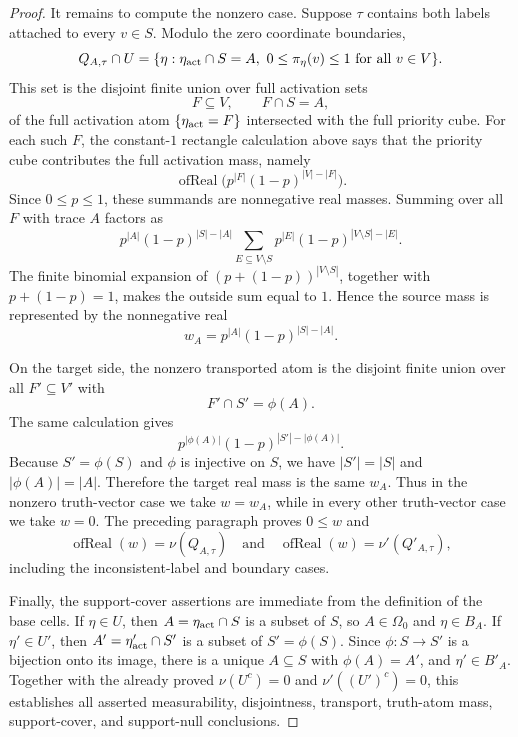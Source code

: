 \begin{proof}
It remains to compute the nonzero case.  Suppose \(\tau\) contains both
labels attached to every \(v\in S\).  Modulo the zero coordinate boundaries,
\[
  Q_{A,\tau}\cap U
  =
  \{\eta:\eta_{\rm act}\cap S=A,\ 0\le\pi_\eta(v)\le1
       \text{ for all }v\in V\}.
\]
This set is the disjoint finite union over full activation sets
\[
  F\subseteq V,\qquad F\cap S=A,
\]
of the full activation atom \(\{\eta_{\rm act}=F\}\) intersected with the
full priority cube.  For each such \(F\), the constant-\(1\) rectangle
calculation above says that the priority cube contributes the full
activation mass, namely
\[
  \operatorname{ofReal}\bigl(p^{|F|}(1-p)^{|V|-|F|}\bigr).
\]
Since \(0\le p\le1\), these summands are nonnegative real masses.  Summing
over all \(F\) with trace \(A\) factors as
\[
  p^{|A|}(1-p)^{|S|-|A|}
  \sum_{E\subseteq V\setminus S} p^{|E|}(1-p)^{|V\setminus S|-|E|}.
\]
The finite binomial expansion of \((p+(1-p))^{|V\setminus S|}\), together
with \(p+(1-p)=1\), makes the outside sum equal to \(1\).  Hence the source
mass is represented by the nonnegative real
\[
  w_A=p^{|A|}(1-p)^{|S|-|A|}.
\]

On the target side, the nonzero transported atom is the disjoint finite union
over all \(F'\subseteq V'\) with
\[
  F'\cap S'=\phi(A).
\]
The same calculation gives
\[
  p^{|\phi(A)|}(1-p)^{|S'|-|\phi(A)|}.
\]
Because \(S'=\phi(S)\) and \(\phi\) is injective on \(S\), we have
\(|S'|=|S|\) and \(|\phi(A)|=|A|\).  Therefore the target real mass is the
same \(w_A\).  Thus in the nonzero truth-vector case we take
\(w=w_A\), while in every other truth-vector case we take \(w=0\).  The
preceding paragraph proves \(0\le w\) and
\[
  \operatorname{ofReal}(w)=\nu(Q_{A,\tau})
  \quad\text{and}\quad
  \operatorname{ofReal}(w)=\nu'(Q'_{A,\tau}),
\]
including the inconsistent-label and boundary cases.

Finally, the support-cover assertions are immediate from the definition of
the base cells.  If \(\eta\in U\), then
\(A=\eta_{\rm act}\cap S\) is a subset of \(S\), so \(A\in\Omega_0\) and
\(\eta\in B_A\).  If \(\eta'\in U'\), then
\(A'=\eta'_{\rm act}\cap S'\) is a subset of \(S'=\phi(S)\).  Since
\(\phi:S\to S'\) is a bijection onto its image, there is a unique
\(A\subseteq S\) with \(\phi(A)=A'\), and \(\eta'\in B'_A\).  Together with
the already proved \(\nu(U^c)=0\) and \(\nu'((U')^c)=0\), this establishes
all asserted measurability, disjointness, transport, truth-atom mass,
support-cover, and support-null conclusions.
\end{proof}
